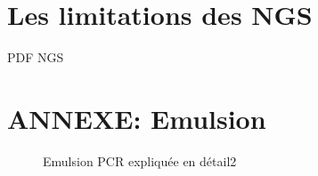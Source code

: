 \documentclass[a4paper]{article}
\begin{document}
\section{Les limitations des NGS}

PDF NGS


\listoffigures  %
\listoftables   %

\section*{ANNEXE: Emulsion}


\begin{figure}[!h]
\caption{Emulsion PCR expliquée en détail2}
\end{figure}
\end{document}
